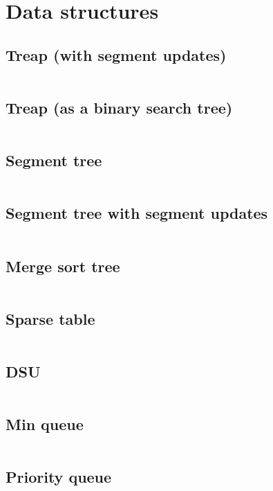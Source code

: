 ﻿\documentclass[10pt,twocolumn,oneside]{article}
\begin{document}
\pagestyle{fancy}
\fancyfoot{}
\fancyhead[R]{\thepage}

\section{Data structures}
\subsection{Treap (with segment updates)}
\inputminted[breaklines]{cpp}{Data structures/treap (segment updates).cpp}
\subsection{Treap (as a binary search tree)}
\inputminted[breaklines]{cpp}{Data structures/treap (as a binsearch tree).cpp}
\subsection{Segment tree}
\inputminted[breaklines]{cpp}{Data structures/segment tree.cpp}
\subsection{Segment tree with segment updates}
\inputminted[breaklines]{cpp}{Data structures/segment tree with segment updates.cpp}
\subsection{Merge sort tree}
\inputminted[breaklines]{cpp}{Data structures/mergesort tree.cpp}
\subsection{Sparse table}
\inputminted[breaklines]{cpp}{Data structures/sparse table.cpp}
\subsection{DSU}
\inputminted[breaklines]{cpp}{Data structures/dsu.cpp}
\subsection{Min queue}
\inputminted[breaklines]{cpp}{Data structures/min queue.cpp}
\subsection{Priority queue}
\inputminted[breaklines]{python}{Data structures/priority queue.py}
\end{document}
